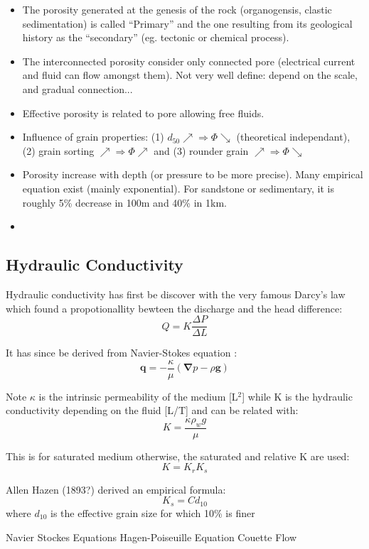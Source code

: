 \documentclass[twocolumn]{article}
\begin{document}
\begin{itemize}
	\item The porosity generated at the genesis of the rock (organogensis, clastic sedimentation) is called ``Primary'' and the one resulting from its geological history as the ``secondary'' (eg. tectonic or chemical process).
	\item The interconnected porosity consider only connected pore (electrical current and fluid can flow amongst them). Not very well define: depend on the scale, and gradual connection...
	\item Effective porosity is related to pore allowing free fluids. 
	\item Influence of grain properties: (1) $d_{50} \nearrow \Rightarrow\Phi \searrow$ (theoretical independant), (2) grain sorting $\nearrow \Rightarrow\Phi \nearrow$ and (3) rounder grain $\nearrow \Rightarrow \Phi \searrow$
	\item Porosity increase with depth (or pressure to be more precise). Many empirical equation exist (mainly exponential). For sandstone or sedimentary, it is roughly 5\% decrease in 100m and 40\% in 1km. 
	\item 
\end{itemize}




\subsection{Hydraulic Conductivity}
Hydraulic conductivity has first be discover with the very famous Darcy's law which found a propotionallity bewteen the discharge and the head difference:
$$Q=K\frac{\Delta P}{\Delta L}$$

It has since be derived from Navier-Stokes equation :
$$\boldsymbol{q}=-\frac{\kappa}{\mu}\left(\boldsymbol{\nabla} p -\rho \boldsymbol{g}\right)$$

Note $\kappa$ is the intrinsic permeability of the medium [L$^2$] while K is the hydraulic conductivity depending on the fluid [L/T] and can be related with:
$$ K=\frac{\kappa \rho_wg}{\mu} $$

This is for saturated medium otherwise, the saturated and relative K are used:
$$ K=K_rK_s$$

Allen Hazen (1893?) derived an empirical formula:
$$ K_s=C d_{10} $$
where $d_ {10}$ is the effective grain size for which 10\% is finer


Navier Stockes Equations
Hagen-Poiseuille Equation
Couette Flow
\end{document}
